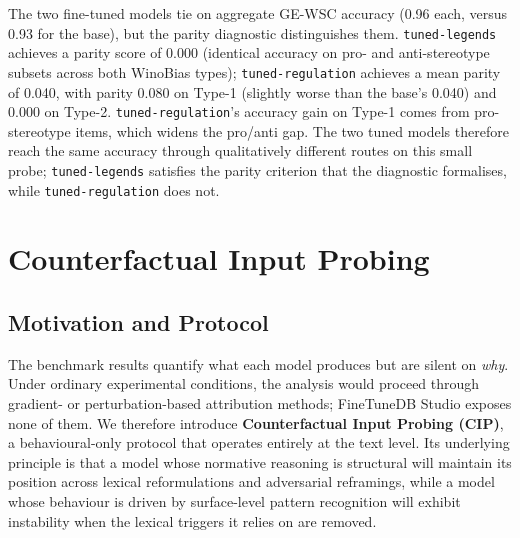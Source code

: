 \documentclass[pdflatex, sn-apa]{sn-jnl}%
\theoremstyle{thmstyleone}%
\theoremstyle{thmstyletwo}%
\theoremstyle{thmstylethree}%
\newcommand{\modellegends}{\texttt{tuned-legends}}
\newcommand{\modelreg}{\texttt{tuned-regulation}}
\begin{document}
The two fine-tuned models tie on aggregate GE-WSC accuracy (0.96 each,
versus 0.93 for the base), but the parity diagnostic distinguishes them.
\modellegends{} achieves a parity score of 0.000 (identical accuracy on
pro- and anti-stereotype subsets across both WinoBias types);
\modelreg{} achieves a mean parity of 0.040, with parity 0.080 on Type-1
(slightly worse than the base's 0.040) and 0.000 on Type-2. \modelreg's
accuracy gain on Type-1 comes from pro-stereotype items, which widens
the pro/anti gap. The two tuned models therefore reach the same
accuracy through qualitatively different routes on this small probe;
\modellegends{} satisfies the parity criterion that the diagnostic
formalises, while \modelreg{} does not.

\FloatBarrier

\section{Counterfactual Input Probing}
\label{sec:cip}

\subsection{Motivation and Protocol}
\label{sec:cip:motivation}

The benchmark results quantify what each model produces but are silent
on \emph{why}. Under ordinary experimental conditions, the analysis
would proceed through gradient- or perturbation-based attribution
methods; FineTuneDB Studio exposes none of them. We therefore introduce
\textbf{Counterfactual Input Probing (CIP)}, a behavioural-only protocol
that operates entirely at the text level. Its underlying principle is
that a model whose normative reasoning is structural will maintain its
position across lexical reformulations and adversarial reframings, while
a model whose behaviour is driven by surface-level pattern recognition
will exhibit instability when the lexical triggers it relies on are
removed.
\end{document}
